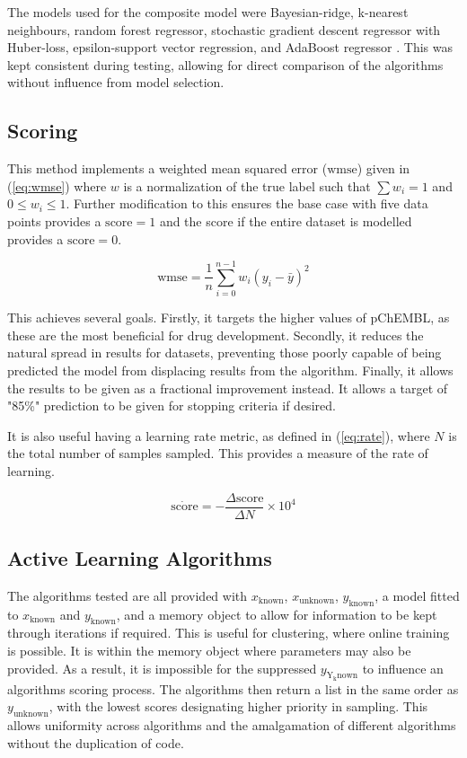 The models used for the composite model were Bayesian-ridge, k-nearest neighbours, random forest regressor, stochastic gradient descent regressor with Huber-loss, epsilon-support vector regression, and AdaBoost regressor \cite{scikit}. This was kept consistent during testing, allowing for direct comparison of the algorithms without influence from model selection.

\subsection{Scoring}
This method implements a weighted mean squared error ($\mathrm{wmse}$) given in (\ref{eq:wmse}) where $w$ is a normalization of the true label such that $\sum{w_i}=1$ and ${0\leq{}w_i\leq{}1}$. Further modification to this ensures the base case with five data points provides a $\mathrm{score}=1$ and the score if the entire dataset is modelled provides a $\mathrm{score}=0$.

\begin{equation}
    \mathrm{wmse}=\frac{1}{n}\sum_{i=0}^{n-1}{w_i(y_i-\bar{y})^2}
    \label{eq:wmse}
\end{equation}

This achieves several goals. Firstly, it targets the higher values of pChEMBL, as these are the most beneficial for drug development. Secondly, it reduces the natural spread in results for datasets, preventing those poorly capable of being predicted the model from displacing results from the algorithm. Finally, it allows the results to be given as a fractional improvement instead. It allows a target of "85\%" prediction to be given for stopping criteria if desired.

It is also useful having a learning rate metric, as defined in (\ref{eq:rate}), where $N$ is the total number of samples sampled. This provides a measure of the rate of learning.

\begin{equation}
    \dot{\mathrm{score}}=-\frac{\Delta\mathrm{score}}{\Delta{}N}\times{}10^4
    \label{eq:rate}
\end{equation}

\subsection{Active Learning Algorithms}
The algorithms tested are all provided with $x_\mathrm{known}$, $x_\mathrm{unknown}$, $y_\mathrm{known}$, a model fitted to $x_\mathrm{known}$ and $y_\mathrm{known}$, and a memory object to allow for information to be kept through iterations if required. This is useful for clustering, where online training is possible. It is within the memory object where parameters may also be provided. As a result, it is impossible for the suppressed $y_\mathrm{Y_known}$ to influence an algorithms scoring process. The algorithms then return a list in the same order as $y_\mathrm{unknown}$, with the lowest scores designating higher priority in sampling. This allows uniformity across algorithms and the amalgamation of different algorithms without the duplication of code.

